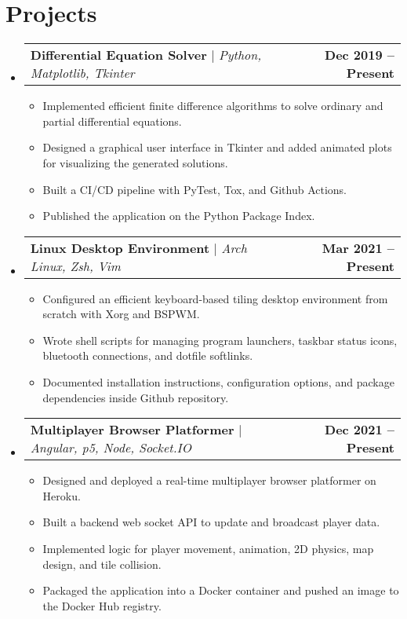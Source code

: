 \documentclass[letterpaper,11pt]{article}
\makeatletter
\newcommand{\resumeItem}[1]{
  \item\small{
    {#1 \vspace{-2pt}}
  }
}
\newcommand{\resumeProjectHeading}[2]{
    \item
    \begin{tabular*}{1.001\textwidth}{l@{\extracolsep{\fill}}r}
      \small#1 & \textbf{\small #2}\\
    \end{tabular*}\vspace{-7pt}
}
\newcommand{\resumeSubHeadingListStart}{\begin{itemize}[leftmargin=0.0in, label={}]}
\newcommand{\resumeSubHeadingListEnd}{\end{itemize}}
\newcommand{\resumeItemListStart}{\begin{itemize}}
\newcommand{\resumeItemListEnd}{\end{itemize}\vspace{-5pt}}
\makeatother
\begin{document}
\section{Projects}
    \vspace{-5pt}
    \resumeSubHeadingListStart
      \resumeProjectHeading
          {\textbf{Differential Equation Solver} $|$ \emph{Python, Matplotlib, Tkinter}}{Dec 2019 -- Present}
          \resumeItemListStart
            \resumeItem{Implemented efficient finite difference algorithms to solve ordinary and partial differential equations.}
            \resumeItem{Designed a graphical user interface in Tkinter and added animated plots for visualizing the generated solutions.}
            \resumeItem{Built a CI/CD pipeline with PyTest, Tox, and Github Actions.}
            \resumeItem{Published the application on the Python Package Index.}
          \resumeItemListEnd
          \vspace{-13pt}
          \resumeProjectHeading
          {\textbf{Linux Desktop Environment} $|$ \emph{Arch Linux, Zsh, Vim}}{Mar 2021 -- Present}
          \resumeItemListStart
          \resumeItem{Configured an efficient keyboard-based tiling desktop environment from scratch with Xorg and BSPWM.}
          \resumeItem{Wrote shell scripts for managing program launchers, taskbar status icons, bluetooth connections, and dotfile softlinks.}
          \resumeItem{Documented installation instructions, configuration options, and package dependencies inside Github repository.}
          \resumeItemListEnd
          \vspace{-13pt}
      \resumeProjectHeading
          {\textbf{Multiplayer Browser Platformer} $|$ \emph{Angular, p5, Node, Socket.IO}}{Dec 2021 -- Present}
          \resumeItemListStart
          \resumeItem{Designed and deployed a real-time multiplayer browser platformer on Heroku.}
          \resumeItem{Built a backend web socket API to update and broadcast player data.}
          \resumeItem{Implemented logic for player movement, animation, 2D physics, map design, and tile collision.}
          \resumeItem{Packaged the application into a Docker container and pushed an image to the Docker Hub registry.}
          \resumeItemListEnd
        \resumeSubHeadingListEnd
\vspace{-15pt}
\end{document}
